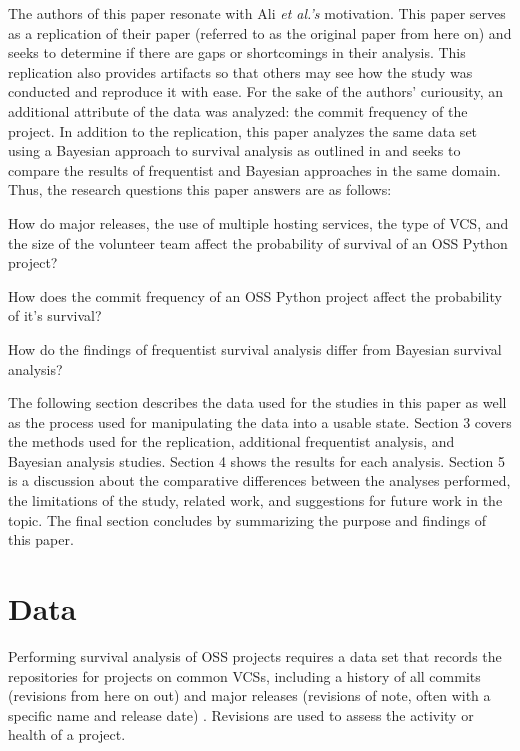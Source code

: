 \documentclass[acmconf]{acmart}
\begin{document}
The authors of this paper resonate with Ali \emph{et al.'s} motivation. 
This paper serves as a replication of their paper \cite{ali2020cheating} (referred to as the original paper from here on)  and seeks to determine if there are gaps or shortcomings in their analysis.
This replication also provides artifacts so that others may see how the study was conducted and reproduce it with ease.
For the sake of the authors' curiousity, an additional attribute of the data was analyzed: the commit frequency of the project.
In addition to the replication, this paper analyzes the same data set using a Bayesian approach to survival analysis as outlined in \cite{kelter2020bayesian} and seeks to compare the results of frequentist and Bayesian approaches in the same domain.
Thus, the research questions this paper answers are as follows:

\begin{questions}
    \item How do major releases, the use of multiple hosting services, the type of VCS, and the size of the volunteer team affect the probability of survival of an OSS Python project?
    \item How does the commit frequency of an OSS Python project affect the probability of it's survival?
    \item How do the findings of frequentist survival analysis differ from Bayesian survival analysis?
\end{questions}

The following section describes the data used for the studies in this paper as well as the process used for manipulating the data into a usable state.
Section 3 covers the methods used for the replication, additional frequentist analysis, and Bayesian analysis studies.
Section 4 shows the results for each analysis.
Section 5 is a discussion about the comparative differences between the analyses performed, the limitations of the study, related work, and suggestions for future work in the topic.
The final section concludes by summarizing the purpose and findings of this paper. 

\section{Data}

Performing survival analysis of OSS projects requires a data set that records the repositories for projects on common VCSs, including a history of all commits (revisions from here on out) and major releases (revisions of note, often with a specific name and release date) \cite{ali2020cheating}.
Revisions are used to assess the activity or health of a project.
\end{document}
